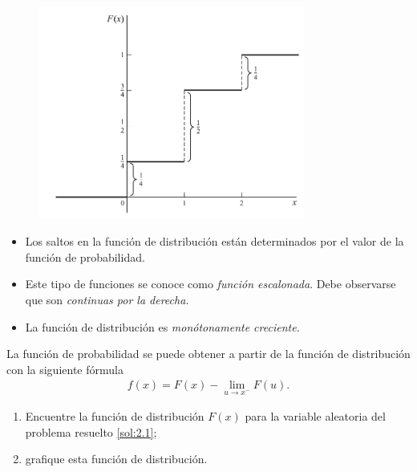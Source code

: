 	\begin{figure}
	\centering
	\includegraphics[height=7cm,keepaspectratio=true]{./pe/pands0201.png}
	\label{fig:0201}
\end{figure}



	\begin{rem}
		\begin{itemize}
			\item Los saltos en la función de distribución están determinados por el valor de la función de probabilidad. 
			\item Este tipo de funciones se conoce como \emph{función escalonada}.  Debe observarse que son \emph{continuas por la derecha.}
			\item La función de distribución es \emph{monótonamente creciente.}
		\end{itemize}

	\end{rem}



	La función de probabilidad se puede obtener a partir de la función de distribución con la siguiente fórmula
	\begin{align}
		\label{2.6}
		f(x)=F(x)-\lim_{u \to x^{-}}F(u).
	\end{align}



 \begin{ejemplo}
  \label{sol:2.3}
  \begin{enumerate}
   \item Encuentre la función de distribución $F(x)$ para la variable aleatoria del problema resuelto \ref{sol:2.1};
   \item grafique esta función de distribución.
  \end{enumerate}

 \end{ejemplo}



